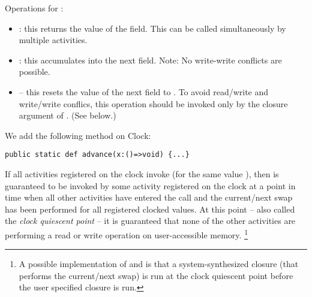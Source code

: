 Operations for :
\begin{itemize}
\item {}: this returns the value of the 
  field. This can be called simultaneously by multiple activities.
\item{}:  this accumulates  into the next field. Note: No
     write-write conflicts are possible.
\item{} -- this resets the value of the next field to . To avoid
     read/write and write/write conflics, this operation should be
     invoked only by the closure argument of
     . (See below.)
\end{itemize}

We add the following method on Clock:
\begin{lstlisting}
public static def advance(x:()=>void) {...}
\end{lstlisting}

If all activities registered on the clock invoke 
(for the same value ), then  is guaranteed to be
invoked by some activity  registered on the clock at a point in time
when all other activities have entered the  call
and the current/next swap has been performed for all registered
clocked values.  At this point -- also called the {\em clock quiescent
point} -- it is guaranteed that none of the other activities are
performing a read or write operation on user-accessible memory.
\footnote{
A possible implementation of  and
 is that a system-synthesized closure (that
performs the current/next swap) is run at the clock quiescent point
before the user specified closure is run.}



